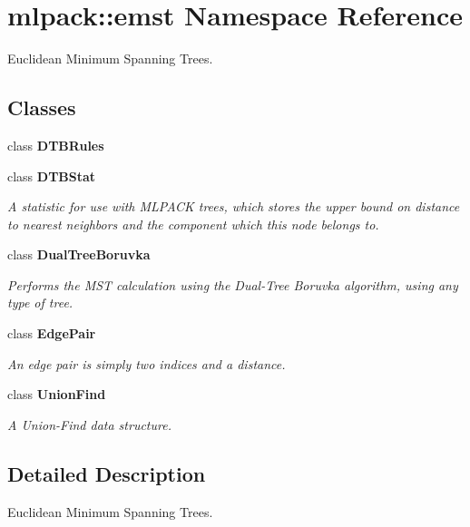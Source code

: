 \section{mlpack\-:\-:emst Namespace Reference}
\label{namespacemlpack_1_1emst}


Euclidean Minimum Spanning Trees.  


\subsection*{Classes}
\begin{DoxyCompactItemize}
\item 
class {\bf D\-T\-B\-Rules}
\item 
class {\bf D\-T\-B\-Stat}
\begin{DoxyCompactList}\small\item\em A statistic for use with M\-L\-P\-A\-C\-K trees, which stores the upper bound on distance to nearest neighbors and the component which this node belongs to. \end{DoxyCompactList}\item 
class {\bf Dual\-Tree\-Boruvka}
\begin{DoxyCompactList}\small\item\em Performs the M\-S\-T calculation using the Dual-\/\-Tree Boruvka algorithm, using any type of tree. \end{DoxyCompactList}\item 
class {\bf Edge\-Pair}
\begin{DoxyCompactList}\small\item\em An edge pair is simply two indices and a distance. \end{DoxyCompactList}\item 
class {\bf Union\-Find}
\begin{DoxyCompactList}\small\item\em A Union-\/\-Find data structure. \end{DoxyCompactList}\end{DoxyCompactItemize}


\subsection{Detailed Description}
Euclidean Minimum Spanning Trees. 